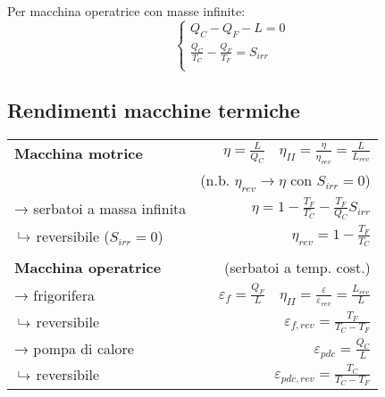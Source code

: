 Per macchina operatrice con masse infinite:
\[
    \begin{cases}
        Q_C - Q_F - L = 0 \\
        \frac{Q_C}{T_C} - \frac{Q_F}{T_F} = S_{irr} \\
    \end{cases}
\]

\subsection{Rendimenti macchine termiche}
{\renewcommand{\arraystretch}{1.5}
\begin{tabular}{p{3.5cm}r}
\textbf{Macchina motrice} & $\eta = \frac{L}{Q_C} \quad \eta_{II} = \frac{\eta}{\eta_{rev}} = \frac{L}{L_{rev}} $\\
& (n.b. $\eta_{rev} \rightarrow \eta $ con $S_{irr} = 0$)\\
→ serbatoi a massa infinita & $\eta = 1 - \frac{T_F}{T_C} - \frac{T_F}{Q_C}S_{irr}$ \\
\phantom{→}$\put(3,2){\line(0,1){5}}\to$ reversibile ($S_{irr} = 0$) & $\eta_{rev} = 1 - \frac{T_F}{T_C}$ \\
\\
\textbf{Macchina operatrice} & (serbatoi a temp. cost.) \\
→ frigorifera & $\varepsilon_f = \frac{Q_F}{L} \quad \eta_{II} = \frac{\varepsilon}{\varepsilon_{rev}} = \frac{L_{rev}}{L}$ \\
\phantom{→}$\put(3,2){\line(0,1){5}}\to$ reversibile & $\varepsilon_{f,rev} = \frac{T_F}{T_C - T_F}$ \\
→ pompa di calore & $\varepsilon_{pdc} = \frac{Q_C}{L}$ \\
\phantom{→}$\put(3,2){\line(0,1){5}}\to$ reversibile & $\varepsilon_{pdc,rev} = \frac{T_C}{T_C - T_F}$ \\
\end{tabular}
}
